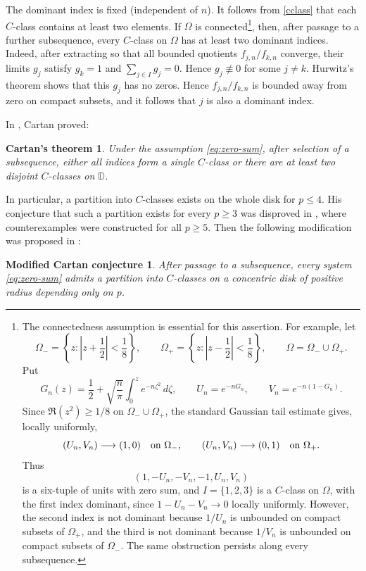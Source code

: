\documentclass[12pt,letterpaper,reqno]{amsart}
\newtheorem*{cartanthm}{Cartan's theorem}
\newtheorem*{modifiedconjecture}{Modified Cartan conjecture}
\theoremstyle{definition}
\numberwithin{equation}{section}
\newcommand{\D}{\mathbb D}
\begin{document}
	The dominant index is fixed (independent of $n$). It follows from
	\eqref{cclass} that each $C$-class contains at least two elements.
If $\Omega$ is connected\footnote{The connectedness
assumption is essential for this assertion. For example, let
\[
\Omega_-=\left\{z:\left|z+\frac12\right|<\frac18\right\},\qquad
\Omega_+=\left\{z:\left|z-\frac12\right|<\frac18\right\},\qquad
\Omega=\Omega_-\cup\Omega_+.
\]
Put
\[
G_n(z)=\frac12+\sqrt{\frac n\pi}\int_0^z e^{-n\zeta^2}\,d\zeta,
\qquad
U_n=e^{-nG_n},\qquad V_n=e^{-n(1-G_n)}.
\]
Since $\Re(z^2)\ge1/8$ on $\Omega_-\cup\Omega_+$, the standard Gaussian
tail estimate gives, locally uniformly,
\[
(U_n,V_n)\longrightarrow(1,0)\quad\hbox{on }\Omega_-,
\qquad
(U_n,V_n)\longrightarrow(0,1)\quad\hbox{on }\Omega_+.
\]
Thus
\[
(1,-U_n,-V_n,-1,U_n,V_n)
\]
is a six-tuple of units with zero sum, and $I=\{1,2,3\}$ is a $C$-class
on $\Omega$, with the first index dominant, since
$1-U_n-V_n\to0$ locally uniformly. However, the second index is not
dominant because $1/U_n$ is unbounded on compact subsets of $\Omega_+$,
and the third is not dominant because $1/V_n$ is unbounded on compact
subsets of $\Omega_-$. The same obstruction persists along every
subsequence.}, then, after passage to a further subsequence,
every $C$-class on $\Omega$ has at least two dominant indices.
Indeed, after extracting so that all bounded
	quotients $f_{j,n}/f_{k,n}$ converge, their limits $g_j$ satisfy
	$g_k=1$ and $\sum_{j\in I}g_j=0$. Hence $g_j\not\equiv0$ for some
	$j\ne k$. Hurwitz's theorem \cite[Chapter~VII, Corollary~2.6]{Con78}
shows that this $g_j$ has no zeros. Hence
$f_{j,n}/f_{k,n}$ is bounded away from zero on compact subsets, and it
follows that $j$ is also a dominant index.
	
	In \cite[pp.~312--318]{Car28},
	Cartan proved:
	
	\begin{cartanthm}
		Under the assumption \eqref{eq:zero-sum}, after selection of a subsequence,
		either all indices form a single $C$-class or there are at least two disjoint
		$C$-classes on $\D$.
	\end{cartanthm}
	
	In particular, a partition into $C$-classes
	exists on the whole disk for $p\leq 4$.
	His conjecture that such a partition exists
	for every $p\geq 3$ was
	disproved in \cite{Ere96a}, where  counterexamples were constructed
	for all $p\ge5$. Then the following
	modification was proposed in
	\cite{Ere96b,Ere15}:
	
	\begin{modifiedconjecture}
		After passage to a subsequence, every system \eqref{eq:zero-sum}
		admits a partition into $C$-classes on a concentric disk of positive
		radius depending only on $p$.
	\end{modifiedconjecture}
	
\end{document}
